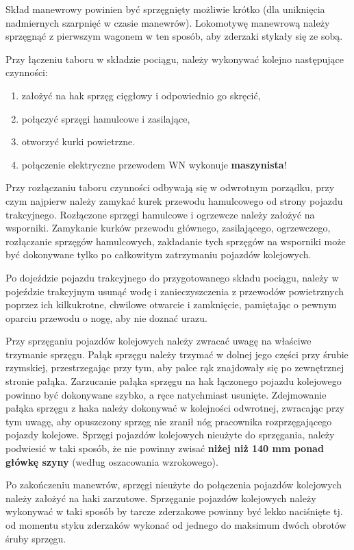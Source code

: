 Skład manewrowy powinien być sprzęgnięty możliwie krótko (dla uniknięcia nadmiernych szarpnięć w czasie manewrów). Lokomotywę manewrową należy sprzęgnąć z pierwszym wagonem w ten sposób, aby zderzaki stykały się ze sobą. 

Przy łączeniu taboru w składzie pociągu, należy wykonywać kolejno następujące czynności: 

\begin{enumerate}
	\item założyć na hak sprzęg cięgłowy i odpowiednio go skręcić, 
	\item połączyć sprzęgi hamulcowe i zasilające, 
	\item otworzyć kurki powietrzne.
	\item połączenie elektryczne przewodem WN wykonuje \textbf{maszynista}!
\end{enumerate}
Przy rozłączaniu taboru czynności odbywają się w odwrotnym porządku, przy czym najpierw należy zamykać kurek przewodu hamulcowego od strony pojazdu trakcyjnego. Rozłączone sprzęgi hamulcowe i ogrzewcze należy założyć na wsporniki. Zamykanie kurków przewodu głównego, zasilającego, ogrzewczego, rozłączanie sprzęgów hamulcowych, zakładanie tych sprzęgów na wsporniki może być dokonywane tylko po całkowitym zatrzymaniu pojazdów kolejowych. 

Po dojeździe pojazdu trakcyjnego do przygotowanego składu pociągu, należy w pojeździe trakcyjnym usunąć wodę i zanieczyszczenia z przewodów powietrznych poprzez ich kilkukrotne, chwilowe otwarcie i zamknięcie, pamiętając o pewnym oparciu przewodu o nogę, aby nie doznać urazu.

Przy sprzęganiu pojazdów kolejowych należy zwracać uwagę na właściwe trzymanie sprzęgu. Pałąk sprzęgu należy trzymać w dolnej jego części przy śrubie rzymskiej, przestrzegając przy tym, aby palce rąk znajdowały się po zewnętrznej stronie pałąka. Zarzucanie pałąka sprzęgu na hak łączonego pojazdu kolejowego powinno być dokonywane szybko, a ręce natychmiast usunięte. Zdejmowanie pałąka sprzęgu z haka należy dokonywać w kolejności odwrotnej, zwracając przy tym uwagę, aby opuszczony sprzęg nie zranił nóg pracownika rozprzęgającego pojazdy kolejowe. Sprzęgi pojazdów kolejowych nieużyte do sprzęgania, należy podwiesić w taki sposób, że nie powinny zwisać \textbf{niżej niż 140 mm ponad główkę szyny} (według oszacowania wzrokowego). 

Po zakończeniu manewrów, sprzęgi nieużyte do połączenia pojazdów kolejowych należy założyć na haki zarzutowe. Sprzęganie pojazdów kolejowych należy wykonywać w taki sposób by tarcze zderzakowe powinny być lekko naciśnięte tj. od momentu styku zderzaków wykonać od jednego do maksimum dwóch obrotów śruby sprzęgu. 

